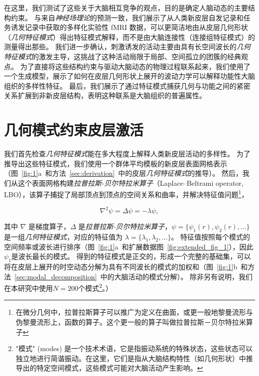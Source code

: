 \documentclass[lang=cn,a4paper,newtx,citestyle=gb7714-2015, bibstyle=gb7714-2015]{elegantpaper}
\begin{document}
在这里，我们测试了这些关于大脑相互竞争的观点，目的是确定人脑动态的主要结构约束。
与来自\textit{神经场理论}的预测一致，我们展示了从人类新皮层自发记录和任务诱发记录中获取的多样化实验性 fMRI 数据，可以更简洁地由从皮层几何形状（\textit{几何特征模式}）得出特征模式解释，而不是由大脑连接性（连接组特征模式）的测量得出那些。
我们进一步确认，刺激诱发的活动主要由具有长空间波长的\textit{几何特征模式}的激发主导，这挑战了这种活动局限于局部、空间孤立的团簇的经典观点。
为了直接将这些结构约束与驱动大脑动态的物理过程联系起来，我们使用了一个生成模型，展示了如何在皮层几何形状上展开的波动力学可以解释功能性大脑组织的多样性特征。
最后，我们展示了通过特征模式捕获几何与功能之间的紧密关系扩展到非新皮层结构，表明这种联系是大脑组织的普遍属性。


\section{几何模式约束皮层激活}
我们首先检查\textit{几何特征模式}能在多大程度上解释人类新皮层活动的多样性。
为了推导出这些特征模式，我们使用一个群体平均模板的新皮层表面网格表示（图~\ref{fig:1}a~和方法~\ref{sec:derivation}~中的皮层\textit{几何特征模式}的推导）。
然后，我们从这个表面网格构建\textit{拉普拉斯-贝尔特拉米算子}（Laplace–Beltrami operator, LBO），该算子捕捉了局部顶点到顶点的空间关系和曲率，并解决特征值问题\footnote{在微分几何中，拉普拉斯算子可以推广为定义在曲面，或更一般地黎曼流形与伪黎曼流形上，函数的算子。这个更一般的算子叫做拉普拉斯－贝尔特拉米算子}，

\begin{equation} \label{eq:1}
	\nabla^2 \psi = \Delta\psi = -\lambda \psi,
\end{equation}


其中 $ \nabla $ 是梯度算子，$ \Delta $ 是\textit{拉普拉斯-贝尔特拉米算子}，$ \psi = \{\psi_1(r), \psi_2(r),...\} $ 是一组\textit{几何特征模式}，对应的特征值为 $ \lambda = \{ \lambda_1, \lambda_2, ... \} $。
特征值按照每个模式的空间频率或波长进行排序（图~\ref{fig:1}a~和扩展数据图~\ref{fig:extended_fig_1}），因此$ \psi_1 $是波长最长的模式。
得到的特征模式是正交的，形成一个完整的基础集，可以将在皮层上展开的时空动态分解为具有不同波长的模式的加权和（图~\ref{fig:1}b~和方法~\ref{sec:modal_decomposition}~中的大脑活动的模式分解）。
除非另有说明，我们在本研究中使用$ N = 200 $个模式\footnote{"模式" (modes) 是一个技术术语，它是指振动系统的特殊状态，这些状态可以独立地进行简谐振动。在这里，它们是指从大脑结构特性（如几何形状）中推导出的特定空间模式，这些模式可能对大脑活动产生影响。}。）
\end{document}
